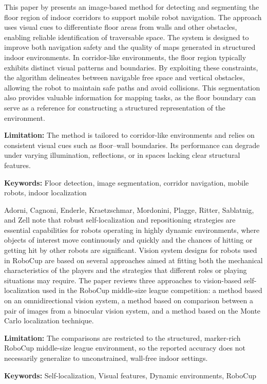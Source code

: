 {
	This paper by \cite{Li:2010} presents an image-based method for detecting
and segmenting the floor region of indoor corridors to support mobile robot navigation.
The approach uses visual cues to differentiate floor areas from walls and other
obstacles, enabling reliable identification of traversable space. The system is designed
to improve both navigation safety and the quality of maps generated in structured
indoor environments. In corridor-like
environments, the floor region typically exhibits distinct visual patterns
and boundaries. By exploiting these constraints, the algorithm delineates
between navigable free space and vertical obstacles, allowing the robot
to maintain safe paths and avoid collisions. This segmentation also
provides valuable information for mapping tasks, as the floor boundary
can serve as a reference for constructing a structured representation of
the environment.

\bigskip

\textbf{Limitation:}
The method is tailored to corridor-like environments and relies on consistent visual
cues such as floor–wall boundaries. Its performance can degrade under varying
illumination, reflections, or in spaces lacking clear structural features.

\bigskip

\scriptsize{\textbf{Keywords:} Floor detection, image segmentation, corridor navigation, mobile robots, indoor localization}
	
}



{
	Adorni, Cagnoni, Enderle, Kraetzschmar, Mordonini, Plagge, Ritter, Sablatnig, and Zell \cite{Adorni:2001} note that robust self-localization and repositioning strategies are essential capabilities for robots operating in highly dynamic environments, where objects of interest move continuously and quickly and the chances of hitting or getting hit by other robots are significant. Vision system designs for robots used in RoboCup are based on several approaches aimed at fitting both the mechanical characteristics of the players and the strategies that different roles or playing situations may require. The paper reviews three approaches to vision-based self-localization used in the RoboCup middle-size league competition: a method based on an omnidirectional vision system, a method based on comparison between a pair of images from a binocular vision system, and a method based on the Monte Carlo localization technique.
	
	\bigskip
	\textbf{Limitation:} The comparisons are restricted to the structured, marker-rich RoboCup middle-size league environment, so the reported accuracy does not necessarily generalize to unconstrained, wall-free indoor settings.
	
	\scriptsize{\textbf{Keywords:} Self-localization, Visual features, Dynamic environments, RoboCup}
}

